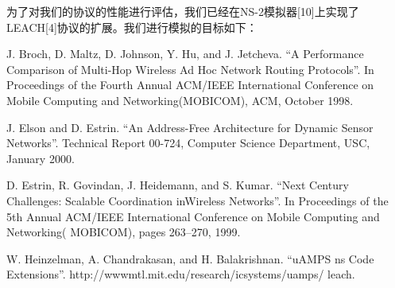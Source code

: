\documentclass[journal]{IEEEtran}
\begin{document}
\begin{CJK}{UTF8}{gbsn}
为了对我们的协议的性能进行评估，我们已经在NS-2模拟器[10]上实现了LEACH[4]协议的扩展。我们进行模拟的目标如下：


\ifCLASSOPTIONcaptionsoff
  \newpage
\fi





%
%
%

\begin{thebibliography}{1}

J. Broch, D. Maltz, D. Johnson, Y. Hu, and J. Jetcheva.
“A Performance Comparison of Multi-Hop Wireless Ad
Hoc Network Routing Protocols”. In Proceedings of the
Fourth Annual ACM/IEEE International Conference on Mobile
Computing and Networking(MOBICOM), ACM, October 1998.

J. Elson and D. Estrin. “An Address-Free Architecture
for Dynamic Sensor Networks”. Technical Report 00-724,
Computer Science Department, USC, January 2000.

D. Estrin, R. Govindan, J. Heidemann, and S. Kumar. “Next
Century Challenges: Scalable Coordination inWireless Networks”.
In Proceedings of the 5th Annual ACM/IEEE International
Conference on Mobile Computing and Networking(
MOBICOM), pages 263–270, 1999.

W. Heinzelman, A. Chandrakasan, and H. Balakrishnan.
“uAMPS ns Code Extensions”. http://wwwmtl.mit.edu/research/icsystems/uamps/ leach.


\end{thebibliography}
\end{CJK}
\end{document}
